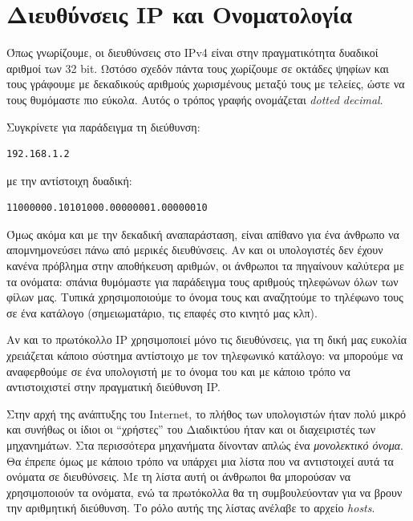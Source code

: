 %
%
\section{Διευθύνσεις IP και Ονοματολογία}
\label{sec:sec34}

Όπως γνωρίζουμε, οι διευθύνσεις στο IPv4 είναι στην πραγματικότητα δυαδικοί αριθμοί των 32 bit.  Ωστόσο σχεδόν πάντα τους χωρίζουμε σε οκτάδες ψηφίων και τους γράφουμε με δεκαδικούς αριθμούς χωρισμένους μεταξύ τους με τελείες, ώστε να τους θυμόμαστε πιο εύκολα. Αυτός ο τρόπος γραφής ονομάζεται \emph{dotted decimal}.

Συγκρίνετε για παράδειγμα τη διεύθυνση:

\begin{center}
\begin{verbatim}
192.168.1.2
\end{verbatim}
\end{center}

με την αντίστοιχη δυαδική:

\begin{center}
\begin{verbatim}
‭11000000‬.‭10101000‬.00000001.00000010
\end{verbatim}
\end{center}

Όμως ακόμα και με την δεκαδική αναπαράσταση, είναι απίθανο για ένα άνθρωπο να απομνημονεύσει πάνω από μερικές διευθύνσεις. Αν και οι υπολογιστές δεν έχουν κανένα πρόβλημα στην αποθήκευση αριθμών, οι άνθρωποι τα πηγαίνουν καλύτερα με τα ονόματα: σπάνια θυμόμαστε για παράδειγμα τους αριθμούς τηλεφώνων όλων των φίλων μας. Τυπικά χρησιμοποιούμε το όνομα τους και αναζητούμε το τηλέφωνο τους σε ένα κατάλογο (σημειωματάριο, τις επαφές στο κινητό μας κλπ). 

Αν και το πρωτόκολλο IP χρησιμοποιεί μόνο τις διευθύνσεις, για τη δική μας ευκολία χρειάζεται κάποιο σύστημα αντίστοιχο με τον τηλεφωνικό κατάλογο: να μπορούμε να αναφερθούμε σε ένα υπολογιστή με το όνομα του και με κάποιο τρόπο να αντιστοιχιστεί στην πραγματική διεύθυνση IP.

Στην αρχή της ανάπτυξης του Internet, το πλήθος των υπολογιστών ήταν πολύ μικρό και συνήθως οι ίδιοι οι ``χρήστες'' του Διαδικτύου ήταν και οι διαχειριστές των μηχανημάτων. Στα περισσότερα μηχανήματα δίνονταν απλώς ένα \emph{μονολεκτικό όνομα}. Θα έπρεπε όμως με κάποιο τρόπο να υπάρχει μια λίστα που να αντιστοιχεί αυτά τα ονόματα σε διευθύνσεις. Με τη λίστα αυτή οι άνθρωποι θα μπορούσαν να χρησιμοποιούν τα ονόματα, ενώ τα πρωτόκολλα θα τη συμβουλεύονταν για να βρουν την αριθμητική διεύθυνση. Το ρόλο αυτής της λίστας ανέλαβε το αρχείο \emph{hosts}.

